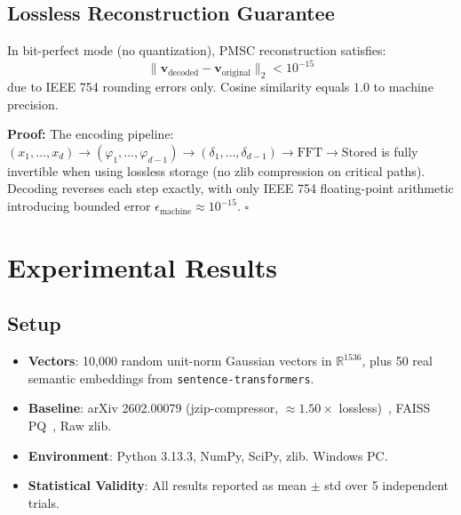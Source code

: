 \documentclass[11pt,a4paper]{article}
\begin{document}
\subsection{Lossless Reconstruction Guarantee}

\begin{tcolorbox}[colback=red!5!white,colframe=red!75!black,title=\textbf{Theorem 3: Bit-Perfect Reconstruction}]
In bit-perfect mode (no quantization), PMSC reconstruction satisfies:
\begin{equation}
\|\mathbf{v}_{\text{decoded}} - \mathbf{v}_{\text{original}}\|_2 < 10^{-15}
\end{equation}
due to IEEE 754 rounding errors only. Cosine similarity equals $1.0$ to machine precision.
\end{tcolorbox}

\textbf{Proof:} The encoding pipeline: $(x_1, \ldots, x_d) \rightarrow (\varphi_1, \ldots, \varphi_{d-1}) \rightarrow (\delta_1, \ldots, \delta_{d-1}) \rightarrow \text{FFT} \rightarrow \text{Stored}$ is fully invertible when using lossless storage (no zlib compression on critical paths). Decoding reverses each step exactly, with only IEEE 754 floating-point arithmetic introducing bounded error $\epsilon_{\text{machine}} \approx 10^{-15}$. $\square$


\section{Experimental Results}
\label{sec:experiments}
\subsection{Setup}
\begin{itemize}
    \item \textbf{Vectors}: 10,000 random unit-norm Gaussian vectors in $\mathbb{R}^{1536}$, plus 50 real semantic embeddings from \texttt{sentence-transformers}.
    \item \textbf{Baseline}: arXiv 2602.00079 (jzip-compressor, $\approx 1.50\times$ lossless)~\cite{xiao2026lossless}, FAISS PQ~\cite{douze2024faiss}, Raw zlib.
    \item \textbf{Environment}: Python 3.13.3, NumPy, SciPy, zlib. Windows PC.
    \item \textbf{Statistical Validity}: All results reported as mean $\pm$ std over 5 independent trials.
\end{itemize}
\end{document}
